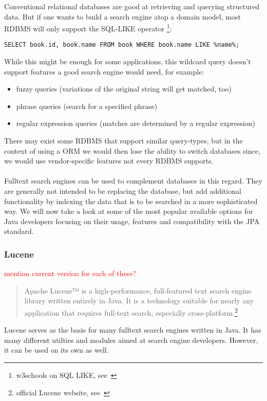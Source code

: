 Conventional relational databases are good at retrieving and querying structured data. But if one wants to build a search engine atop a domain model, most RDBMS will only support the SQL-LIKE operator \footnote{w3schools on SQL LIKE, see~\cite{sql_like_w3schools}}:\\

\lstset{language=sql}
\begin{lstlisting}[frame=htrbl, caption={SQL LIKE operator in use}, label={lst:result2}]
SELECT book.id, book.name FROM book WHERE book.name LIKE %name%;
\end{lstlisting}
While this might be enough for some applications, this wildcard query doesn't support features a good search engine would need, for example:

\begin{itemize}
	\item fuzzy queries (variations of the original string will get matched, too)
	\item phrase queries (search for a specified phrase)
	\item regular expression queries (matches are determined by a regular expression)
\end{itemize}
There may exist some RDBMS that support similar query-types, but in the context of using a ORM we would then lose the ability to switch databases since, we would use vendor-specific features not every RDBMS supports.
\\\\
Fulltext search engines can be used to complement databases in this regard. They are generally not intended to be replacing the database, but add additional functionality by indexing the data that is to be searched in a more sophisticated way. We will now take a look at some of the most popular available options for Java developers focusing on their usage, features and compatibility with the JPA standard.

\pagebreak

\subsubsection{Lucene}

\textcolor{red}{mention current version for each of these?}

\begin{quote}
	Apache Lucene™ is a high-performance, full-featured text search engine library written entirely in Java. It is a technology suitable for nearly any application that requires full-text search, especially cross-platform.\footnote{official Lucene website, see~\cite{lucene_apache_org}}
\end{quote}
Lucene serves as the basis for many fulltext search engines written in Java. It has many different utilties and modules aimed at search engine developers. However, it can be used on its own as well.

